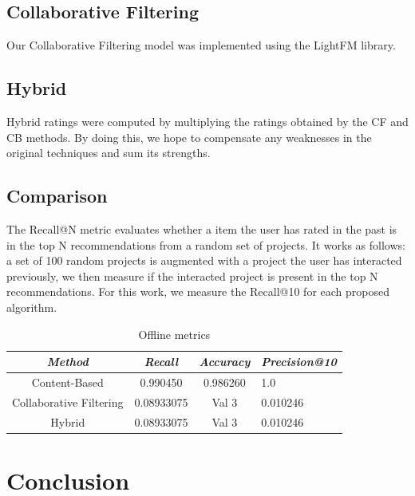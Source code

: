 \documentclass[cic,tc,english]{iiufrgs}
\begin{document}
\section{Collaborative Filtering}
Our Collaborative Filtering model was implemented using the LightFM library. 
\section{Hybrid}
Hybrid ratings were computed by multiplying the ratings obtained by the CF and CB methods. By doing this, we hope to compensate any weaknesses in the original techniques and sum its strengths.
\section{Comparison}
The Recall@N metric evaluates whether a item the user has rated in the past is in the top N recommendations from a random set of projects. It works as follows: a set of 100 random projects is augmented with a project the user has interacted previously, we then measure if the interacted project is present in the top N recommendations. For this work, we measure the Recall@10 for each proposed algorithm.
\begin{table}[h]
    \caption{Offline metrics}
    \centering
        \begin{tabular}{c|c|c|p{5cm}}
          \hline
          \textit{Method}  &   \textit{Recall}  &   \textit{Accuracy}  &   \textit{Precision@10} \\
          \hline
          \hline
          Content-Based           &   0.990450           & 0.986260 &  1.0 \\
          Collaborative Filtering     & 0.08933075             & Val 3  & 0.010246\\
          Hybrid     & 0.08933075             & Val 3  & 0.010246\\
          \hline
        \end{tabular}
    \label{tbl:offline_metrics}
\end{table}

\chapter{Conclusion}
\end{document}
